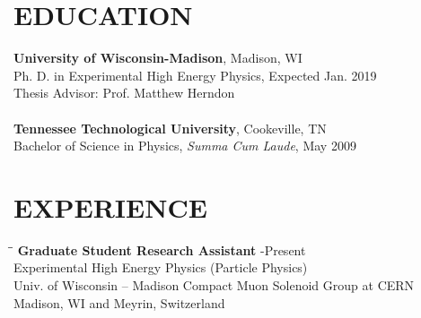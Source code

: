 \documentclass[10pt]{res} %
\begin{document}

\address{{\bf Current Address} \\  CERN 32/4-B03  \\  CH-1211 Geneva 23 \\ Switzerland }
\address{{\bf Permanent Address} \\ 141 County Hill Rd. \\ Blountville,
TN 37617 \\ (423) 323-8326}

\begin{resume}

\section{EDUCATION}
  \textbf{University of Wisconsin-Madison}, Madison, WI \\
Ph. D. in Experimental High Energy Physics, Expected Jan. 2019 \\
Thesis Advisor: Prof. Matthew Herndon \\
\\
  \textbf{Tennessee Technological University}, Cookeville, TN \\
Bachelor of Science in Physics, \textit{Summa Cum Laude}, May 2009 \\

\section{EXPERIENCE}
\vspace{-0.1in}
\begin{tabbing}
\hspace{2.3in}\= \hspace{2.5in}\= \kill %
{\bf Graduate Student Research Assistant} \>-Present \\
Experimental High Energy Physics  (Particle Physics)\\
Univ. of Wisconsin -- Madison Compact Muon Solenoid Group at CERN   \\  Madison, WI and Meyrin, Switzerland \\
\end{tabbing}\vspace{-20pt}      %


\end{resume}
\end{document}
